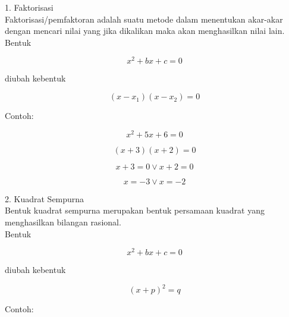 \begin{eulernotebook}
\begin{eulercomment}
\begin{eulercomment}
\begin{eulercomment}
1. Faktorisasi\\
Faktorisasi/pemfaktoran adalah suatu metode dalam menentukan akar-akar
dengan mencari nilai yang jika dikalikan maka akan menghasilkan nilai
lain.\\
Bentuk\\
\end{eulercomment}
\begin{eulerformula}
\[
x^2+bx+c=0
\]
\end{eulerformula}
\begin{eulercomment}
diubah kebentuk\\
\end{eulercomment}
\begin{eulerformula}
\[
(x-x_{1})(x-x_{2})=0
\]
\end{eulerformula}
\begin{eulercomment}
Contoh:\\
\end{eulercomment}
\begin{eulerformula}
\[
x^2+5x+6=0
\]
\end{eulerformula}
\begin{eulerformula}
\[
(x+3)(x+2)=0
\]
\end{eulerformula}
\begin{eulerformula}
\[
x+3=0 \vee x+2=0
\]
\end{eulerformula}
\begin{eulerformula}
\[
x=-3 \vee x=-2
\]
\end{eulerformula}
\begin{eulercomment}
2. Kuadrat Sempurna\\
Bentuk kuadrat sempurna merupakan bentuk persamaan kuadrat yang
menghasilkan bilangan rasional.\\
Bentuk\\
\end{eulercomment}
\begin{eulerformula}
\[
x^2+bx+c=0
\]
\end{eulerformula}
\begin{eulercomment}
diubah kebentuk\\
\end{eulercomment}
\begin{eulerformula}
\[
(x+p)^2=q
\]
\end{eulerformula}
\begin{eulercomment}
Contoh:\\
\end{eulercomment}
\begin{eulerformula}
\[
\]
\end{eulerformula}
\end{eulercomment}
\end{eulercomment}
\end{eulernotebook}
